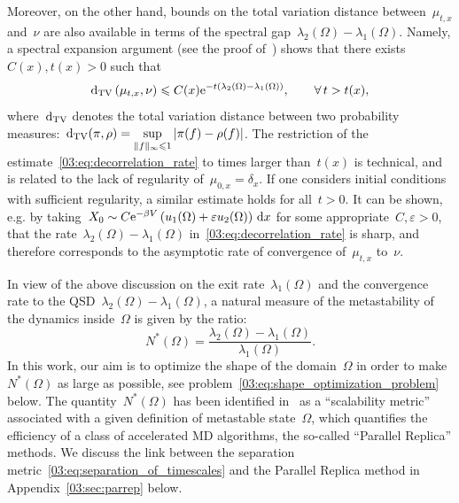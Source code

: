     Moreover, on the other hand, bounds on the total variation distance between~$\mu_{t,x}$ and~$\nu$ are also available in terms of the spectral gap~$\lambda_{2}(\Omega)-\lambda_{1}(\Omega)$. Namely, a spectral expansion argument (see the proof of~\cite[Theorem~1.1]{SL13}) shows that there exists~$C(x),t(x)>0$ such that
    \begin{equation}
        \label{03:eq:decorrelation_rate}
        \mathrm{d}_{\mathrm{TV}}\left(\mu_{t,x},\nu\right) \leqslant C(x)\mathrm{e}^{-t(\lambda_2(\Omega)-\lambda_1(\Omega))},\qquad \forall\,t>t(x),
    \end{equation} 
    where~$\mathrm{d}_{\mathrm{TV}}$ denotes the total variation distance between two probability measures:~$\mathrm{d}_{\mathrm{TV}}(\pi,\rho) = \underset{\|f\|_{\infty}\leqslant 1}{\sup}\,|\pi(f)-\rho(f)|$.
    The restriction of the estimate~\eqref{03:eq:decorrelation_rate} to times larger than~$t(x)$ is technical, and is related to the lack of regularity of~$\mu_{0,x}=\delta_x$.
    If one considers initial conditions with sufficient regularity, a similar estimate holds for all~$t>0$.
    It can be shown, e.g. by taking~$X_0\sim C\mathrm{e}^{-\beta V}\left(u_1(\Omega)+\varepsilon u_2(\Omega)\right)\,\mathrm{d} x$ for some appropriate~$C,\varepsilon>0$, that the rate~$\lambda_2(\Omega)-\lambda_1(\Omega)$ in~\eqref{03:eq:decorrelation_rate} is sharp, and therefore corresponds to the asymptotic rate of convergence of~$\mu_{t,x}$ to~$\nu$.
    
    In view of the above discussion on the exit rate~$\lambda_1(\Omega)$ and the convergence rate to the QSD~$\lambda_2(\Omega)-\lambda_1(\Omega)$, a natural measure of the metastability of the dynamics inside~$\Omega$ is given by the ratio:
    \begin{equation}
        \label{03:eq:separation_of_timescales}
        N^*(\Omega) = \frac{\lambda_{2}(\Omega)-\lambda_1(\Omega)}{\lambda_1(\Omega)}.
    \end{equation}
    In this work, our aim is to optimize the shape of the domain~$\Omega$ in order to make~$N^*(\Omega)$ as large as possible, see problem~\eqref{03:eq:shape_optimization_problem} below. The quantity~$N^*(\Omega)$ has been identified in~\cite{V98,PUV15} as a ``scalability metric'' associated with a given definition of metastable state~$\Omega$, which quantifies the efficiency of a class of accelerated MD algorithms, the so-called ``Parallel Replica'' methods.
    We discuss the link between the separation metric~\eqref{03:eq:separation_of_timescales} and the Parallel Replica method in Appendix~\ref{03:sec:parrep} below.
    
